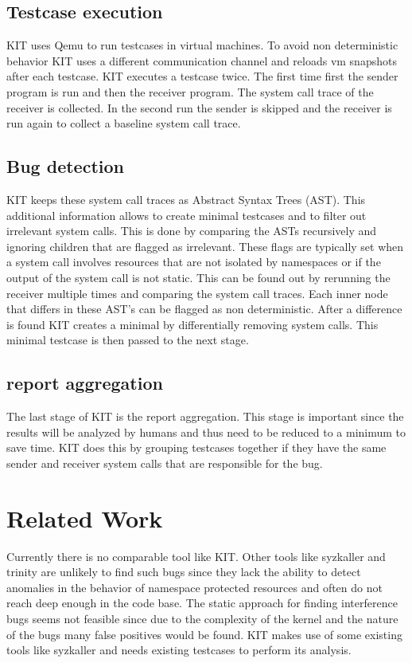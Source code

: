 \documentclass[10pt,twocolumn,a4paper]{article}
\begin{document}
\subsection{Testcase execution}
KIT uses Qemu to run testcases in virtual machines. To avoid non deterministic behavior KIT uses
a different communication channel and reloads vm snapshots after each testcase. KIT executes a
testcase twice. The first time first the sender program is run and then the receiver program. The
system call trace of the receiver is collected. In the second run the sender is skipped and the receiver
is run again to collect a baseline system call trace\cite{0}. 
\subsection{Bug detection}
KIT keeps these system call traces as Abstract Syntax Trees (AST). This additional information allows 
to create minimal testcases and to filter out irrelevant system calls. This is done by comparing the ASTs
recursively and ignoring children that are flagged as irrelevant. These flags are typically set when
a system call involves resources that are not isolated by namespaces or if the output of the
system call is not static. This can be found out by rerunning the receiver multiple times and
comparing the system call traces. Each inner node that differs in these AST's can be flagged as non
deterministic.
After a difference is found KIT creates a minimal by differentially removing system calls. This
minimal testcase is then passed to the next stage\cite{0}.
\subsection{report aggregation}
The last stage of KIT is the report aggregation. This stage is important since the results will be
analyzed by humans and thus need to be reduced to a minimum to save time. KIT does this by grouping
testcases together if they have the same sender and receiver system calls that are responsible for
the bug\cite{0}. 

\section{Related Work}
Currently there is no comparable tool like KIT. Other tools like syzkaller\cite{4} and trinity\cite{5} are
unlikely to find such bugs since they lack the ability to detect anomalies in the behavior of
namespace protected resources and often do not reach deep enough in the code base.
The static approach for finding interference bugs seems not feasible
since due to the complexity of the kernel and the nature of the bugs many false positives would
be found. KIT makes use of some existing tools like syzkaller and needs existing testcases to
perform its analysis\cite{0}\cite{2}.
\end{document}

